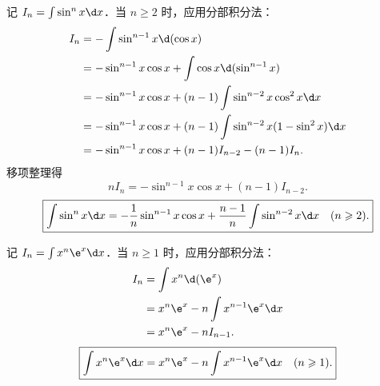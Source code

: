 \begin{solution}

    记 $I_n = \int \sin^n x \d x$．当 $n \geqslant 2$ 时，应用分部积分法：
    \begin{equation}
        \begin{aligned}
            I_n & = -\int \sin^{n-1} x \d(\cos x)                                     \\
                & = -\sin^{n-1} x \cos x + \int \cos x \d(\sin^{n-1} x)               \\
                & = -\sin^{n-1} x \cos x + (n-1)\int \sin^{n-2} x \cos^2 x \d x       \\
                & = -\sin^{n-1} x \cos x + (n-1)\int \sin^{n-2} x (1 - \sin^2 x) \d x \\
                & = -\sin^{n-1} x \cos x + (n-1)I_{n-2} - (n-1)I_n.
        \end{aligned}
    \end{equation}
    移项整理得
    \begin{equation}
        n I_n = -\sin^{n-1} x \cos x + (n-1)I_{n-2}.
    \end{equation}
    \begin{equation}
        \boxed{\int \sin^n x \d x = -\frac{1}{n}\sin^{n-1} x \cos x + \frac{n-1}{n}\int \sin^{n-2} x \d x \quad (n \geqslant 2).}
    \end{equation}


    记 $I_n = \int x^n \e^x \d x$．当 $n \geqslant 1$ 时，应用分部积分法：
    \begin{equation}
        \begin{aligned}
            I_n & = \int x^n \d(\e^x)                   \\
                & = x^n \e^x - n \int x^{n-1} \e^x \d x \\
                & = x^n \e^x - n I_{n-1}.
        \end{aligned}
    \end{equation}
    \begin{equation}
        \boxed{\int x^n \e^x \d x = x^n \e^x - n \int x^{n-1} \e^x \d x \quad (n \geqslant 1).}
    \end{equation}
\end{solution}

